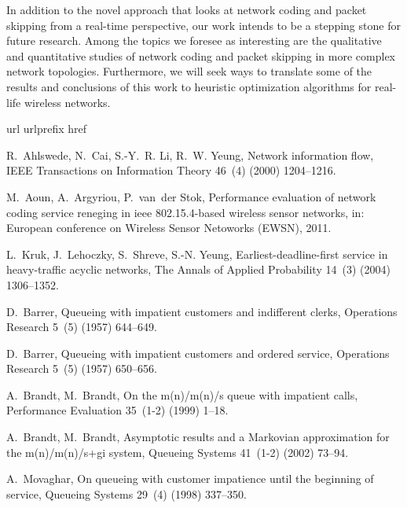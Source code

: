 \documentclass[preprint,12pt]{elsarticle}
\theoremstyle{definition}
\theoremstyle{plain}
\theoremstyle{remark}
\begin{document}
In addition to the novel approach that looks at network coding and packet skipping from a real-time perspective, our work intends to be a stepping stone for future research. Among the topics we foresee as interesting are the qualitative and quantitative studies of network coding and packet skipping in more complex network topologies. Furthermore, we will seek ways to translate some of the results and conclusions of this work to heuristic optimization algorithms for real-life wireless networks.



\begin{thebibliography}{100}
\expandafter\ifx\csname url\endcsname\relax
  \def\url#1{\texttt{#1}}\fi
\expandafter\ifx\csname urlprefix\endcsname\relax\def\urlprefix{URL }\fi
\expandafter\ifx\csname href\endcsname\relax
  \def\href#1#2{#2} \def\path#1{#1}\fi

R.~Ahlswede, N.~Cai, S.-Y.~R. Li, R.~W. Yeung, Network information flow, IEEE
  Transactions on Information Theory 46~(4) (2000) 1204--1216.

M.~Aoun, A.~Argyriou, P.~van~der Stok, Performance evaluation of network coding
  service reneging in ieee 802.15.4-based wireless sensor networks, in:
  European conference on Wireless Sensor Netoworks (EWSN), 2011.

L.~Kruk, J.~Lehoczky, S.~Shreve, S.-N. Yeung, Earliest-deadline-first service
  in heavy-traffic acyclic networks, The Annals of Applied Probability 14~(3)
  (2004) 1306--1352.

D.~Barrer, {Q}ueueing with impatient customers and indifferent clerks,
  Operations Research 5~(5) (1957) 644--649.

D.~Barrer, {Q}ueueing with impatient customers and ordered service, Operations
  Research 5~(5) (1957) 650--656.

A.~Brandt, M.~Brandt, On the m(n)/m(n)/s queue with impatient calls,
  Performance Evaluation 35~(1-2) (1999) 1--18.

A.~Brandt, M.~Brandt, Asymptotic results and a {M}arkovian approximation for
  the m(n)/m(n)/s+gi system, Queueing Systems 41~(1-2) (2002) 73--94.

A.~Movaghar, On queueing with customer impatience until the beginning of
  service, Queueing Systems 29~(4) (1998) 337--350.


\end{thebibliography}
\end{document}

